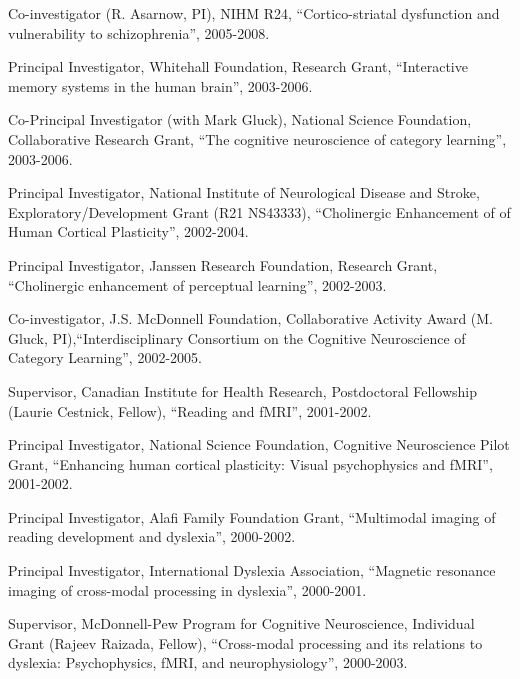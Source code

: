 \documentclass[10pt, letterpaper]{article}
\begin{document}
Co-investigator (R. Asarnow, PI), NIHM R24, ``Cortico-striatal dysfunction and vulnerability to schizophrenia'', 2005-2008.\vspace{2mm}

Principal Investigator, Whitehall Foundation, Research Grant, ``Interactive memory systems in the human brain'', 2003-2006.\vspace{2mm}

Co-Principal Investigator (with Mark Gluck), National Science Foundation, Collaborative Research Grant, ``The cognitive neuroscience of category learning'', 2003-2006.\vspace{2mm}
      
Principal Investigator, National Institute of Neurological Disease and Stroke, Exploratory/Development Grant (R21 NS43333), ``Cholinergic Enhancement of of Human Cortical Plasticity'',  2002-2004.\vspace{2mm}
      
Principal Investigator, Janssen Research Foundation, Research Grant, ``Cholinergic enhancement of perceptual learning'', 2002-2003.\vspace{2mm}
      
Co-investigator, J.S. McDonnell Foundation, Collaborative Activity Award (M. Gluck, PI),``Interdisciplinary Consortium on the Cognitive Neuroscience of Category Learning'', 2002-2005.\vspace{2mm}
      
Supervisor, Canadian Institute for Health Research, Postdoctoral Fellowship (Laurie Cestnick, Fellow), ``Reading and fMRI'', 2001-2002.\vspace{2mm}
      
Principal Investigator, National Science Foundation, Cognitive Neuroscience Pilot Grant, ``Enhancing human cortical plasticity: Visual psychophysics and fMRI'', 2001-2002.\vspace{2mm}
      
Principal Investigator, Alafi Family Foundation Grant, ``Multimodal imaging of reading development and dyslexia'', 2000-2002.\vspace{2mm}
      
Principal Investigator, International Dyslexia Association, ``Magnetic resonance imaging of cross-modal processing in dyslexia'', 2000-2001.\vspace{2mm}
      
Supervisor, McDonnell-Pew Program for Cognitive Neuroscience, Individual Grant (Rajeev Raizada, Fellow), ``Cross-modal processing and its relations to dyslexia: Psychophysics, fMRI, and neurophysiology'', 2000-2003.\vspace{2mm}
      
\end{document}
